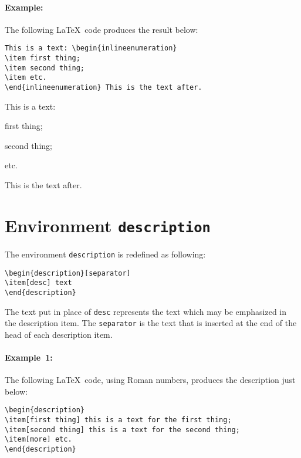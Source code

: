 \documentclass[book]{upmethodology-document}
\begin{document}
\paragraph{Example:} The following \LaTeX~code produces the result below:
\begin{verbatim}
This is a text: \begin{inlineenumeration}
\item first thing;
\item second thing;
\item etc.
\end{inlineenumeration} This is the text after.
\end{verbatim}

This is a text: \begin{inlineenumeration}
\item first thing;
\item second thing;
\item etc.
\end{inlineenumeration} This is the text after.

\section{Environment \texttt{description}}

The environment \texttt{description} is redefined as following:
\begin{verbatim}
\begin{description}[separator]
\item[desc] text
\end{description}
\end{verbatim}
The text put in place of \texttt{desc} represents the text which may be emphasized in the description item.
The \texttt{separator} is the text that is inserted at the end of the head of each description item.


\paragraph{Example~1:} The following \LaTeX~code, using Roman numbers, produces the description just below:
\begin{verbatim}
\begin{description}
\item[first thing] this is a text for the first thing;
\item[second thing] this is a text for the second thing;
\item[more] etc.
\end{description}
\end{verbatim}
\end{document}
